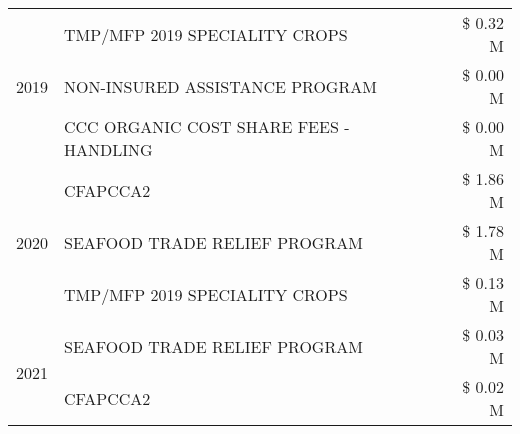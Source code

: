 \begin{tabular}{llr}
\cline{1-3}
\multirow[t]{3}{*}{2019} & TMP/MFP 2019 SPECIALITY CROPS & \$ 0.32 M \\
 & NON-INSURED ASSISTANCE PROGRAM & \$ 0.00 M \\
 & CCC ORGANIC COST SHARE FEES - HANDLING & \$ 0.00 M \\
\cline{1-3}
\multirow[t]{3}{*}{2020} & CFAPCCA2 & \$ 1.86 M \\
 & SEAFOOD TRADE RELIEF PROGRAM & \$ 1.78 M \\
 & TMP/MFP 2019 SPECIALITY CROPS & \$ 0.13 M \\
\cline{1-3}
\multirow[t]{2}{*}{2021} & SEAFOOD TRADE RELIEF PROGRAM & \$ 0.03 M \\
 & CFAPCCA2 & \$ 0.02 M \\
\cline{1-3}
\bottomrule
\end{tabular}

